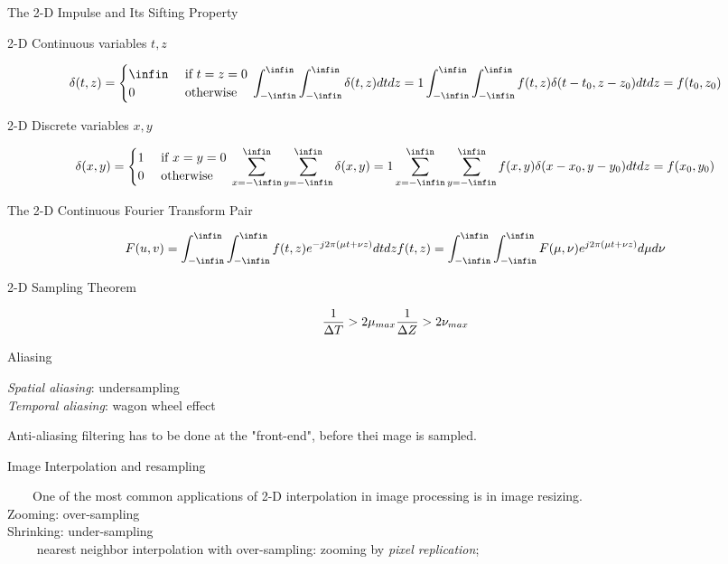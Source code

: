 \documentclass[]{article}
\begin{document}
The 2-D Impulse and Its Sifting Property

2-D Continuous variables \(t,z\)

\[\delta(t,z)=\begin{cases}
\infin & \text{    if $t=z=0$}
\\0 & \text{    otherwise}
\end{cases}
\\ \int^{\infin}_{-\infin} \int^{\infin}_{-\infin}\delta(t,z)dtdz=1\\
\int^{\infin}_{-\infin} \int^{\infin}_{-\infin}f(t,z)\delta(t-t_0,z-z_0)dtdz=f(t_0,z_0)\]

2-D Discrete variables \(x,y\)

\[\delta(x,y)=\begin{cases}
1 & \text{    if $x=y=0$}
\\0 & \text{    otherwise}
\end{cases}
\\ \sum\limits^{\infin}_{x=-\infin} \sum\limits^{\infin}_{y=-\infin}\delta(x,y)=1\\
\sum\limits^{\infin}_{x=-\infin} \sum\limits^{\infin}_{y=-\infin}f(x,y)\delta(x-x_0,y-y_0)dtdz=f(x_0,y_0)\]

The 2-D Continuous Fourier Transform Pair

\[F(u,v)= \int^{\infin}_{-\infin} \int^{\infin}_{-\infin}f(t,z)e^{-j2\pi(\mu t + \nu z)}dtdz\\
f(t,z)= \int^{\infin}_{-\infin} \int^{\infin}_{-\infin}F(\mu,\nu)e^{j2\pi (\mu t+\nu z)}d\mu d\nu\]

2-D Sampling Theorem

\[\dfrac{1}{\Delta T}>2\mu_{max}\\
\dfrac{1}{\Delta Z}>2\nu_{max}\]

Aliasing

\emph{Spatial aliasing}: undersampling\\
 \emph{Temporal aliasing}: wagon wheel effect

Anti-aliasing filtering has to be done at the "front-end", before thei
mage is sampled.

Image Interpolation and resampling

\(\quad\quad\)One of the most common applications of 2-D interpolation
in image processing is in image resizing.\\
 Zooming: over-sampling\\
 Shrinking: under-sampling\\

\(\quad\quad\) nearest neighbor interpolation with over-sampling:
zooming by \emph{pixel replication};
\end{document}
